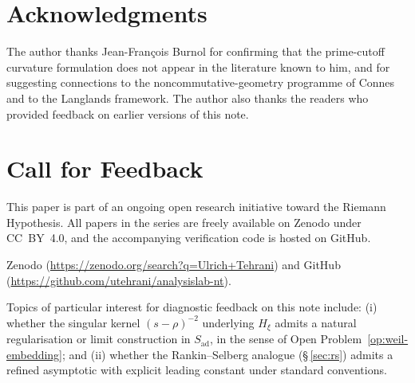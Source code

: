 \documentclass[11pt]{article}
\newcommand{\Hxi}{H_{\xi}}
\newcommand{\Sad}{S_{\mathrm{ad}}}
\begin{document}
\section*{Acknowledgments}

The author thanks Jean-Fran\c{c}ois Burnol for confirming
that the prime-cutoff curvature formulation does not appear
in the literature known to him, and for suggesting connections
to the noncommutative-geometry programme of Connes and to the
Langlands framework.
The author also thanks the readers who provided feedback on
earlier versions of this note.

\section*{Call for Feedback}

This paper is part of an ongoing open research initiative
toward the Riemann Hypothesis.
All papers in the series are freely available on Zenodo under
CC~BY~4.0, and the accompanying verification code is hosted
on GitHub.

{\sloppy
Zenodo (\url{https://zenodo.org/search?q=Ulrich+Tehrani})
and GitHub
(\url{https://github.com/utehrani/analysislab-nt}).
\par}

Topics of particular interest for diagnostic feedback on this
note include:
(i) whether the singular kernel $(s-\rho)^{-2}$ underlying
$\Hxi$ admits a natural regularisation or limit construction
in $\Sad$, in the sense of
Open Problem~\ref{op:weil-embedding}; and
(ii) whether the Rankin--Selberg analogue
(\S\,\ref{sec:rs}) admits a refined asymptotic with explicit
leading constant under standard conventions.
\end{document}
